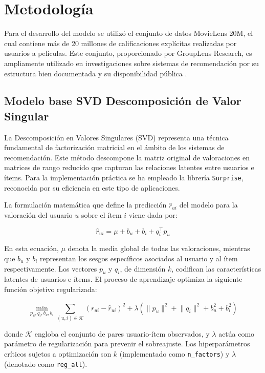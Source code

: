 \documentclass[twocolumn,10pt]{article}
\begin{document}
\section{Metodología}
Para el desarrollo del modelo se utilizó el conjunto de datos MovieLens 20M, el cual contiene más de 20 millones de calificaciones explícitas realizadas por usuarios a películas. Este conjunto, proporcionado por GroupLens Research, es ampliamente utilizado en investigaciones sobre sistemas de recomendación por su estructura bien documentada y su disponibilidad pública \citep{movielens2025}.

\subsection{Modelo base SVD Descomposición de Valor Singular}

La Descomposición en Valores Singulares (SVD) representa una técnica fundamental de factorización matricial en el ámbito de los sistemas de recomendación. Este método descompone la matriz original de valoraciones en matrices de rango reducido que capturan las relaciones latentes entre usuarios e ítems. Para la implementación práctica se ha empleado la librería \texttt{Surprise}, reconocida por su eficiencia en este tipo de aplicaciones.

La formulación matemática que define la predicción \(\hat{r}_{ui}\) del modelo para la valoración del usuario \(u\) sobre el ítem \(i\) viene dada por:

\[
\hat{r}_{ui} = \mu + b_u + b_i + q_i^\top p_u
\]

En esta ecuación, \(\mu\) denota la media global de todas las valoraciones, mientras que \(b_u\) y \(b_i\) representan los sesgos específicos asociados al usuario y al ítem respectivamente. Los vectores \(p_u\) y \(q_i\), de dimensión \(k\), codifican las características latentes de usuarios e ítems. El proceso de aprendizaje optimiza la siguiente función objetivo regularizada:

\[
\min_{p_u, q_i, b_u, b_i} \sum_{(u,i) \in \mathcal{K}} \left( r_{ui} - \hat{r}_{ui} \right)^2 + \lambda \left( \lVert p_u \rVert^2 + \lVert q_i \rVert^2 + b_u^2 + b_i^2 \right)
\]

donde \(\mathcal{K}\) engloba el conjunto de pares usuario-ítem observados, y \(\lambda\) actúa como parámetro de regularización para prevenir el sobreajuste. Los hiperparámetros críticos sujetos a optimización son \(k\) (implementado como \texttt{n\_factors}) y \(\lambda\) (denotado como \texttt{reg\_all}).
\end{document}
